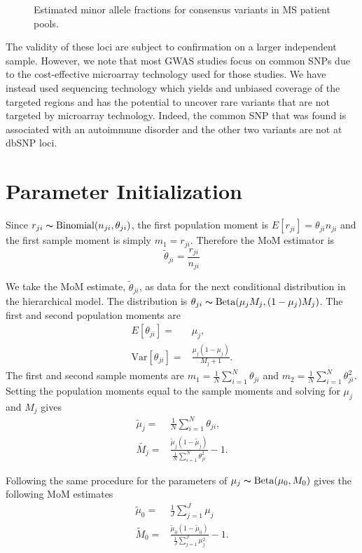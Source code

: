 \documentclass[11pt,reqno]{amsart}
\begin{document}
\begin{figure}[h]
\begin{center}
\caption{Estimated minor allele fractions for consensus variants in MS patient pools.}
\label{fig:MS_MAF}
\end{center}
\end{figure}

The validity of these loci are subject to confirmation on a larger independent sample. However, we note that most GWAS studies focus on common SNPs due to the cost-effective microarray technology used for those studies. We have instead used sequencing technology which yields and unbiased coverage of the targeted regions and has the potential to uncover rare variants that are not targeted by microarray technology. Indeed, the common SNP that was found is associated with an autoimmune disorder and the other two variants are not at dbSNP loci.

\appendix
\section{Parameter Initialization}\label{sec:appendix_mom}
Since $r_{ji} \thicksim \text{Binomial}(n_{ji}, \theta_{ji})$, the first population moment is  $E[r_{ji}] = \theta_{ji} n_{ji}$ and the first sample moment is simply $m_1 = r_{ji}$. Therefore the MoM estimator is 
\begin{equation}
	\tilde{\theta}_{ji} = \frac{r_{ji}} {n_{ji}}
\end{equation}

We take the MoM estimate, $\tilde{\theta}_{ji}$, as data for the next conditional distribution in the hierarchical model. The distribution is $\theta_{ji} \thicksim \text{Beta}(\mu_jM_j, (1-\mu_j)M_j)$. The first and second population moments are
\begin{eqnarray}
	E[\theta_{ji}] =& \mu_j,\\
	\text{Var}[\theta_{ji}] =& \frac{\mu_j(1-\mu_j)} { M_j + 1 }.
\end{eqnarray}
The first and second sample moments are $m_1 = \frac{1}{N}\sum_{i=1}^N \theta_{ji}$ and $m_2 = \frac{1}{N}\sum_{i=1}^N \theta_{ji}^2$. Setting the population moments equal to the sample moments and solving for $\mu_j$ and $M_j$ gives
\begin{eqnarray}
	\tilde{\mu}_j =& \frac{1}{N} \sum_{i=1}^N \theta_{ji}, \\
	\tilde{M_j} =& \frac{ \tilde{\mu}_j (1 - \tilde{\mu}_j ) } { \frac{1}{N} \sum_{i=1}^N \theta_{ji}^2 } -1.
\end{eqnarray}

Following the same procedure for the parameters of $\mu_j \thicksim \text{Beta}(\mu_0, M_0)$ gives the following MoM estimates
\begin{eqnarray}
	\tilde{\mu}_0 =& \frac{1}{J} \sum_{j=1}^J \mu_j \\
	\tilde{M}_0 =& \frac{ \tilde{\mu}_0 (1 - \tilde{\mu}_0 ) } {\frac{1}{J} \sum_{j=1}^J \mu_j^2 } -1.
\end{eqnarray}



\end{document}
